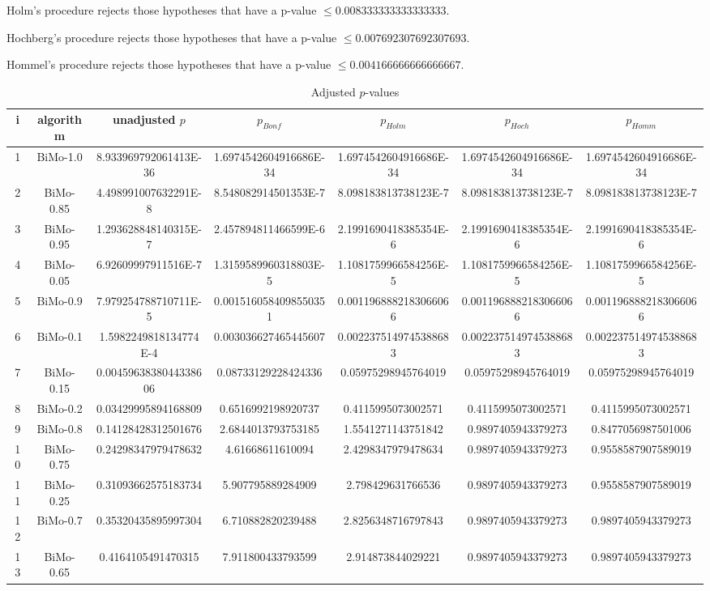 \documentclass[a4paper,10pt]{article}
\begin{document}
\begin{landscape}
Holm's procedure rejects those hypotheses that have a p-value $\le0.008333333333333333$.


Hochberg's procedure rejects those hypotheses that have a p-value $\le0.007692307692307693$.


Hommel's procedure rejects those hypotheses that have a p-value $\le0.004166666666666667$.


\begin{table}[!htp]
\centering\tiny
\caption{Adjusted $p$-values}
\begin{tabular}{ccccccc}
i&algorithm&unadjusted $p$&$p_{Bonf}$&$p_{Holm}$&$p_{Hoch}$&$p_{Homm}$\\
\hline
1&BiMo-1.0&8.933969792061413E-36&1.6974542604916686E-34&1.6974542604916686E-34&1.6974542604916686E-34&1.6974542604916686E-34\\
2&BiMo-0.85&4.498991007632291E-8&8.548082914501353E-7&8.098183813738123E-7&8.098183813738123E-7&8.098183813738123E-7\\
3&BiMo-0.95&1.293628848140315E-7&2.457894811466599E-6&2.1991690418385354E-6&2.1991690418385354E-6&2.1991690418385354E-6\\
4&BiMo-0.05&6.92609997911516E-7&1.3159589960318803E-5&1.1081759966584256E-5&1.1081759966584256E-5&1.1081759966584256E-5\\
5&BiMo-0.9&7.979254788710711E-5&0.0015160584098550351&0.0011968882183066066&0.0011968882183066066&0.0011968882183066066\\
6&BiMo-0.1&1.5982249818134774E-4&0.003036627465445607&0.0022375149745388683&0.0022375149745388683&0.0022375149745388683\\
7&BiMo-0.15&0.0045963838044338606&0.08733129228424336&0.05975298945764019&0.05975298945764019&0.05975298945764019\\
8&BiMo-0.2&0.03429995894168809&0.6516992198920737&0.4115995073002571&0.4115995073002571&0.4115995073002571\\
9&BiMo-0.8&0.14128428312501676&2.6844013793753185&1.5541271143751842&0.9897405943379273&0.8477056987501006\\
10&BiMo-0.75&0.24298347979478632&4.61668611610094&2.4298347979478634&0.9897405943379273&0.9558587907589019\\
11&BiMo-0.25&0.31093662575183734&5.907795889284909&2.798429631766536&0.9897405943379273&0.9558587907589019\\
12&BiMo-0.7&0.35320435895997304&6.710882820239488&2.8256348716797843&0.9897405943379273&0.9897405943379273\\
13&BiMo-0.65&0.4164105491470315&7.911800433793599&2.914873844029221&0.9897405943379273&0.9897405943379273\\

\end{tabular}
\end{table}
\end{landscape}
\end{document}
